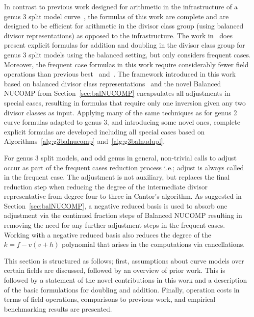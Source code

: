 In contrast to previous work designed for arithmetic in the infrastructure of a
genus 3 split model curve~\cite{rad2019jacobian}, the formulas of this work are
complete and are designed to be efficient for arithmetic in the divisor class
group (using balanced divisor representations) as opposed to the infrastructure.
The work in~\cite{Sutherland_g3_2019} does present explicit formulas for
addition and doubling in the divisor class group for genus 3 split models using
the balanced setting, but only considers frequent cases. Moreover, the frequent
case formulas in this work require considerably fewer field operations than
previous best~\cite{rad2019jacobian} and~\cite{Sutherland_g3_2019}. The
framework introduced in this work based on balanced divisor class
representations~\cite{Galbraith_balanced_2008} and the novel Balanced NUCOMP from
Section~\ref{sec:balNUCOMP} encapsulates all adjustments in special cases,
resulting in formulas that require only one inversion given any two divisor
classes as input. Applying many of the same techniques as for genus 2 curve
formulas adapted to genus 3, and introducing some novel ones, complete explicit
formulas are developed including all special cases based on
Algorithms~\ref{alg:g3balnucomp} and~\ref{alg:g3balnudupl}.

For genus 3 split models, and odd genus in general, non-trivial calls to
adjust occur as part of the frequent cases reduction process  i.e.; adjust is
always called in the frequent case. The adjustment is not auxiliary, but
replaces the final reduction step when reducing the degree of the intermediate
divisor representative from degree four to three in Cantor's algorithm. As
suggested in Section~\ref{sec:balNUCOMP}, a negative reduced basis is used to
absorb one adjustment via the continued fraction steps of Balanced NUCOMP
resulting in removing the need for any further adjustment steps in the frequent
cases. Working with a negative reduced basis also reduces the degree of the $k =
f - v(v+h)$ polynomial that arises in the computations via cancellations.


This section is structured as follows; first, assumptions about curve models
over certain fields are discussed, followed by an overview of prior work. This
is followed by a statement of the novel contributions in this work and a
description of the basic formulations for doubling and addition.
Finally, operation costs in terms of field operations, comparisons to previous
work, and empirical benchmarking results are presented.

